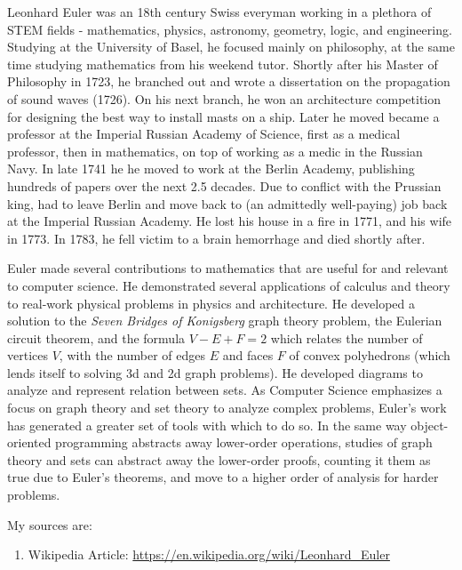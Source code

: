 \documentclass{article}
\begin{document}
Leonhard Euler was an 18th century Swiss everyman working in a plethora of STEM fields - mathematics, physics, astronomy, geometry, logic, and engineering. Studying at the University of Basel, he focused mainly on philosophy, at the same time studying mathematics from his weekend tutor. Shortly after his Master of Philosophy in 1723, he branched out and wrote a dissertation on the propagation of sound waves (1726). On his next branch, he won an architecture competition for designing the best way to install masts on a ship. Later he moved became a professor at the Imperial Russian Academy of Science, first as a medical professor, then in mathematics, on top of working as a medic in the Russian Navy. In late 1741 he he moved to work at the Berlin Academy, publishing hundreds of papers over the next 2.5 decades. Due to conflict with the Prussian king, had to leave Berlin and move back to (an admittedly well-paying) job back at the Imperial Russian Academy. He lost his house in a fire in 1771, and his wife in 1773. In 1783, he fell victim to a brain hemorrhage and died shortly after.

Euler made several contributions to mathematics that are useful for and relevant to computer science. He demonstrated several applications of calculus and theory to real-work physical problems in physics and architecture. He developed a solution to the \emph{Seven Bridges of Konigsberg} graph theory problem, the Eulerian circuit theorem, and the formula $V - E + F = 2$ which relates the number of vertices $V$, with the number of edges $E$ and faces $F$ of convex polyhedrons (which lends itself to solving 3d and 2d graph problems). He developed diagrams to analyze and represent relation between sets. As Computer Science emphasizes a focus on graph theory and set theory to analyze complex problems, Euler's work has generated a greater set of tools with which to do so. In the same way object-oriented programming abstracts away lower-order operations, studies of graph theory and sets can abstract away the lower-order proofs, counting it them as true due to Euler's theorems, and move to a higher order of analysis for harder problems.

My sources are:
\begin{enumerate}
        \item Wikipedia Article: \url{https://en.wikipedia.org/wiki/Leonhard_Euler}
\end{enumerate}

%
%
\end{document}
